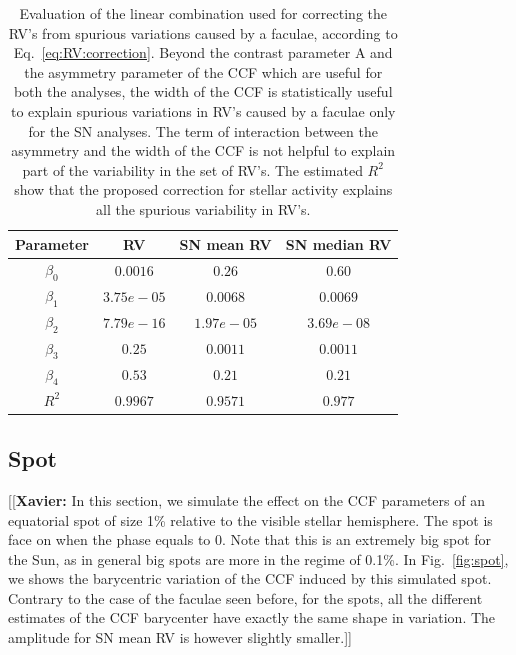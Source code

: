 \documentclass{aa}
\newcommand{\xavier}[1]{{\color{blue}[[\textbf{Xavier: }#1]]}}
\begin{document}
\begin{table}
\centering
\begin{tabular}{|c|c|c|c|}
\hline
Parameter          & RV         &   SN mean RV &   SN median RV \\
\hline
$\beta_{0}$            &    $0.0016$    & $0.26$ & $0.60$ \\
\hline
$\beta_{1}$            &    $3.75e-05$    & $0.0068$ & $0.0069$ \\
\hline
$\beta_{2}$            &     $7.79e-16$   &  $1.97e-05$ & $3.69e-08$\\
\hline
$\beta_{3}$            &     $0.25$   &  $0.0011$ & $0.0011$\\
\hline
$\beta_{4}$            &     $0.53$   &  $0.21$ & $0.21$\\
\hline
$R^{2}$      &     $0.9967$    &  $0.9571$ & $0.977$  \\
\hline
\end{tabular}
\caption{Evaluation of the linear combination used for correcting the RV's from spurious variations caused by a faculae, according to Eq.~\ref{eq:RV:correction}. Beyond the contrast parameter A and the asymmetry parameter of the CCF which are useful for both the analyses, the width of the CCF is statistically useful to explain spurious variations in RV's caused by a faculae only for the SN analyses. The term of interaction between the asymmetry and the width of the CCF is not helpful to explain part of the variability in the set of RV's. The estimated $R^{2}$ show that the proposed correction for stellar activity explains all the spurious variability in RV's.}
\label{table:faculae.test}
\end{table}

\subsection{Spot} \label{sec:soap.spot}

\xavier{In this section, we simulate the effect on the CCF parameters of an equatorial spot of size 1\% relative to the visible stellar hemisphere. The spot is face on when the phase equals to 0. Note that this is an extremely big spot for the Sun, as in general big spots are more in the regime of 0.1\%.
In Fig.~\ref{fig:spot}, we shows the barycentric variation of the CCF induced by this simulated spot. Contrary to the case of the faculae seen before, for the spots, all the different estimates of the CCF barycenter have exactly the same shape in variation. The amplitude for SN mean RV is however slightly smaller.} 
\end{document}
